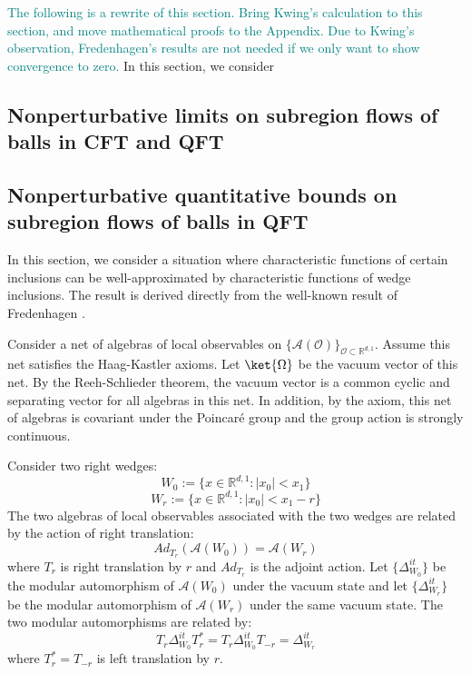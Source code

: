 \documentclass[a4paper,11pt]{article}
\theoremstyle{definition}
\newcommand{\YC}[1]{\textcolor{teal}{#1}}
\begin{document}
\YC{The following is a rewrite of this section. Bring Kwing's calculation to this section, and move mathematical proofs to the Appendix. Due to Kwing's observation, Fredenhagen's results are not needed if we only want to show convergence to zero.}
In this section, we consider 

\subsection{Nonperturbative limits on subregion flows of balls in CFT and QFT}\label{subsection:nonperturblimit}


\subsection{Nonperturbative quantitative bounds on subregion flows of balls in QFT}\label{subsectoin:nonperturbbound}



In this section, we consider a situation where characteristic functions of certain inclusions can be well-approximated by characteristic functions of wedge inclusions. The result is derived directly from the well-known result of Fredenhagen \cite{fredenhagen}.

Consider a net of algebras of local observables on $\{\mathcal{A}(\mathcal{O})\}_{\mathcal{O}\subset\mathbb{R}^{d,1}}$. Assume this net satisfies the Haag-Kastler axioms. Let $\ket{\Omega}$ be the vacuum vector of this net. By the Reeh-Schlieder theorem, the vacuum vector is a common cyclic and separating vector for all algebras in this net. In addition, by the axiom, this net of algebras is covariant under the Poincaré group and the group action is strongly continuous.

Consider two right wedges:
\begin{equation}
    W_0 := \{x\in\mathbb{R}^{d,1}: |x_0| < x_1\}
\end{equation}
\begin{equation}
    W_{r} := \{x\in\mathbb{R}^{d,1}: |x_0 | < x_1 - r \}
\end{equation}
The two algebras of local observables associated with the two wedges are related by the action of right translation:
\begin{equation}
    Ad_{T_r}(\mathcal{A}(W_0)) = \mathcal{A}(W_r)
\end{equation}
where $T_r$ is right translation by $r$ and $Ad_{T_r}$ is the adjoint action. Let $\{\Delta_{W_0}^{it}\}$ be the modular automorphism of $\mathcal{A}(W_0)$ under the vacuum state and let $\{\Delta_{W_r}^{it}\}$ be the modular automorphism of $\mathcal{A}(W_r)$ under the same vacuum state. The two modular automorphisms are related by:
\begin{equation}
    T_r\Delta_{W_0}^{it}T_r^* = T_r\Delta_{W_0}^{it}T_{-r} = \Delta^{it}_{W_r}
\end{equation}
where $T_r^* = T_{-r}$ is left translation by $r$.
\end{document}
